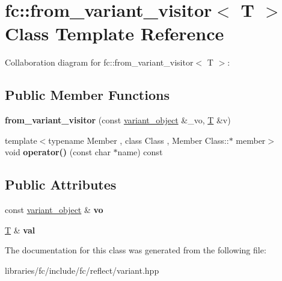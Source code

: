 \hypertarget{classfc_1_1from__variant__visitor}{}\section{fc\+:\+:from\+\_\+variant\+\_\+visitor$<$ T $>$ Class Template Reference}
\label{classfc_1_1from__variant__visitor}


Collaboration diagram for fc\+:\+:from\+\_\+variant\+\_\+visitor$<$ T $>$\+:
\subsection*{Public Member Functions}
\begin{DoxyCompactItemize}
\item 
\mbox{\label{classfc_1_1from__variant__visitor_a969f21d46d2070f8ecdda1c8a91b3aa8}} 
{\bfseries from\+\_\+variant\+\_\+visitor} (const \mbox{\hyperlink{classfc_1_1variant__object}{variant\+\_\+object}} \&\+\_\+vo, \mbox{\hyperlink{struct_t}{T}} \&v)
\item 
\mbox{\label{classfc_1_1from__variant__visitor_a12bbcb40a620b94586095d351b68322c}} 
{\footnotesize template$<$typename Member , class Class , Member Class\+::$\ast$ member$>$ }\\void {\bfseries operator()} (const char $\ast$name) const
\end{DoxyCompactItemize}
\subsection*{Public Attributes}
\begin{DoxyCompactItemize}
\item 
\mbox{\label{classfc_1_1from__variant__visitor_ab05a6ea018ccc226cc4a477bf4fab022}} 
const \mbox{\hyperlink{classfc_1_1variant__object}{variant\+\_\+object}} \& {\bfseries vo}
\item 
\mbox{\label{classfc_1_1from__variant__visitor_adbf544da1ca1ebbe806fdecf26767bce}} 
\mbox{\hyperlink{struct_t}{T}} \& {\bfseries val}
\end{DoxyCompactItemize}


The documentation for this class was generated from the following file\+:\begin{DoxyCompactItemize}
\item 
libraries/fc/include/fc/reflect/variant.\+hpp\end{DoxyCompactItemize}
